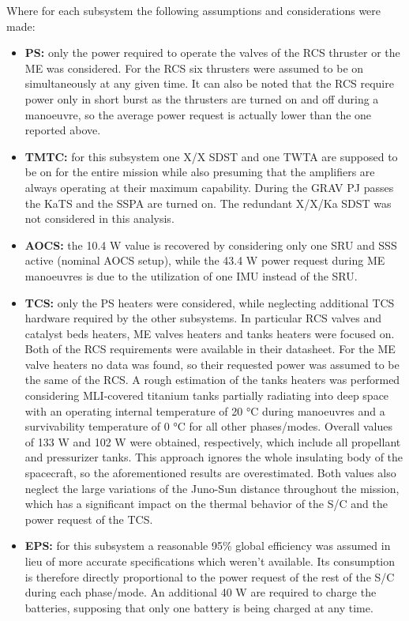 Where for each subsystem the following assumptions and considerations were made:
\begin{itemize}
    \item \textbf{PS:} only the power required to operate the valves of the RCS thruster or the ME was considered. For the RCS six thrusters were assumed to be on simultaneously at any given time. It can also be noted that the RCS require power only in short burst as the thrusters are turned on and off during a manoeuvre, so the average power request is actually lower than the one reported above.
    \item \textbf{TMTC:} for this subsystem one X/X SDST and one TWTA are supposed to be on for the entire mission while also presuming that the amplifiers are always operating at their maximum capability. During the GRAV PJ passes the KaTS and the SSPA are turned on. The redundant X/X/Ka SDST was not considered in this analysis.
    \item \textbf{AOCS:} the 10.4 W value is recovered by considering only one SRU and SSS active (nominal AOCS setup), while the 43.4 W power request during ME manoeuvres is due to the utilization of one IMU instead of the SRU.
    \item \textbf{TCS:} only the PS heaters were considered, while neglecting additional TCS hardware required by the other subsystems. In particular RCS valves and catalyst beds heaters, ME valves heaters and tanks heaters were focused on. Both of the RCS requirements were available in their datasheet. \cite{RCS_values}
    For the ME valve heaters no data was found, so their requested power was assumed to be the same of the RCS. A rough estimation of the tanks heaters was performed considering MLI-covered titanium tanks partially radiating into deep space with an operating internal temperature of 20 °C during manoeuvres and a survivability temperature of 0 °C for all other phases/modes. Overall values of 133 W and 102 W were obtained, respectively, which include all propellant and pressurizer tanks. This approach ignores the whole insulating body of the spacecraft, so the aforementioned results are overestimated. Both values also neglect the large variations of the Juno-Sun distance throughout the mission, which has a significant impact on the thermal behavior of the S/C and the power request of the TCS. 
    \item \textbf{EPS:} for this subsystem a reasonable 95\% global efficiency was assumed in lieu of more accurate specifications which weren't available. Its consumption is therefore directly proportional to the power request of the rest of the S/C during each phase/mode. An additional 40 W are required to charge the batteries, \cite{batteries_info} supposing that only one battery is being charged at any time.     

\end{itemize}
